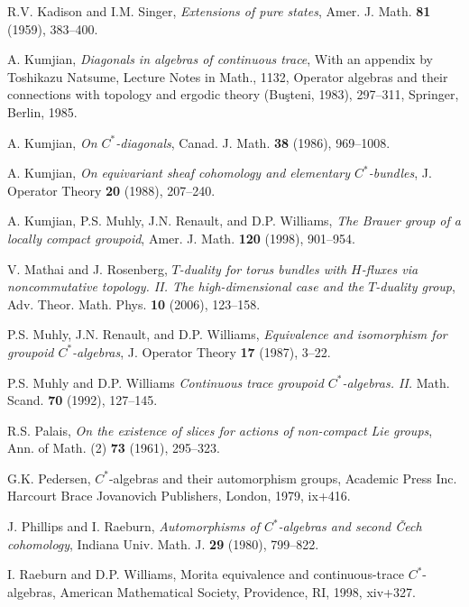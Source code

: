 \documentclass[12pt,a4paper]{amsart}
\begin{document}
\begin{thebibliography}{00}
 R.V. Kadison  and I.M. Singer,
    \emph{Extensions of pure states}, Amer. J. Math. \textbf{81}
    (1959),  383--400.

 A. Kumjian, \emph{Diagonals in algebras of
    continuous trace}, With an appendix by Toshikazu Natsume,
    Lecture Notes in Math., 1132, Operator algebras and their
    connections with topology and ergodic theory ({B}u\c steni,
    1983), 297--311, Springer, Berlin, 1985.

     A. Kumjian, \emph{On
    {$C^\ast$}-diagonals}, Canad. J. Math. \textbf{38} (1986),
    969--1008.

     A. Kumjian, \emph{On equivariant sheaf
    cohomology and elementary {$C^*$}-bundles}, J. Operator
    Theory \textbf{20} (1988), 207--240.


 A. Kumjian, P.S. Muhly, J.N. Renault, and D.P.
    Williams, \emph{The {B}rauer group of a locally compact
    groupoid}, Amer. J. Math. \textbf{120} (1998),
    901--954.

 V. Mathai  and J. Rosenberg, \emph{{$T$}-duality
    for torus bundles with {$H$}-fluxes via noncommutative
    topology. {II}. {T}he high-dimensional case and the
    {$T$}-duality group}, Adv. Theor. Math. Phys. \textbf{10}
    (2006), 123--158.

 P.S. Muhly, J.N. Renault, and D.P. Williams,
    \emph{Equivalence and isomorphism for groupoid
    {$C^\ast$}-algebras}, J. Operator Theory \textbf{17} (1987),
    3--22.

 P.S. Muhly and D.P. Williams \emph{Continuous
    trace groupoid $C^*$-algebras. II.} Math. Scand. \textbf{70}
    (1992), 127--145.

 R.S. Palais, \emph{On the existence of slices for
    actions of non-compact {L}ie groups}, Ann. of Math. (2)
    \textbf{73} (1961),  295--323.

 G.K. Pedersen, {$C^{\ast} $}-algebras and their
    automorphism groups, Academic Press Inc. Harcourt Brace
    Jovanovich Publishers, London, 1979, ix+416.

 J. Phillips  and I. Raeburn, \emph{Automorphisms of
    {$C^{\ast} $}-algebras and second \v {C}ech cohomology},
    Indiana Univ. Math. J. \textbf{29} (1980), 799--822.

 I. Raeburn  and D.P. Williams, Morita equivalence
    and continuous-trace {$C^*$}-algebras, American Mathematical
    Society, Providence, RI, 1998, xiv+327.


\end{thebibliography}
\end{document}
